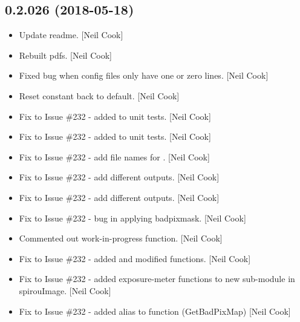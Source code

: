 \documentclass[a4paper,10pt,english]{report}
\begin{document}
\subsection{0.2.026 (2018-05-18)}
\label{\detokenize{misc/changelog:id433}}\begin{itemize}
\item {} 
Update readme. {[}Neil Cook{]}

\item {} 
Rebuilt pdfs. {[}Neil Cook{]}

\item {} 
Fixed bug when config files only have one or zero lines. {[}Neil Cook{]}

\item {} 
Reset constant back to default. {[}Neil Cook{]}

\item {} 
Fix to Issue \#232 - added  to unit tests. {[}Neil
Cook{]}

\item {} 
Fix to Issue \#232 - added  to unit tests. {[}Neil
Cook{]}

\item {} 
Fix to Issue \#232 - add file names for . {[}Neil Cook{]}

\item {} 
Fix to Issue \#232 - add different outputs. {[}Neil Cook{]}

\item {} 
Fix to Issue \#232 - add different outputs. {[}Neil Cook{]}

\item {} 
Fix to Issue \#232 - bug in applying badpixmask. {[}Neil Cook{]}

\item {} 
Commented out work-in-progress function. {[}Neil Cook{]}

\item {} 
Fix to Issue \#232 - added  and modified
 functions. {[}Neil Cook{]}

\item {} 
Fix to Issue \#232 - added exposure-meter functions to new sub-module
in spirouImage. {[}Neil Cook{]}

\item {} 
Fix to Issue \#232 - added alias to  function
(GetBadPixMap) {[}Neil Cook{]}


\end{itemize}
\end{document}
